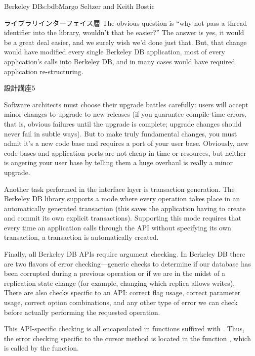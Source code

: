 \begin{aosachapter}{Berkeley DB}{s:bdb}{Margo Seltzer and Keith Bostic}
\begin{aosasect1}{ライブラリインターフェイス層}
The obvious question is ``why not pass a thread identifier into the
library, wouldn't that be easier?'' The answer is yes, it would be a
great deal easier, and we surely wish we'd done just that. But, that
change would have modified every single Berkeley DB application, most
of every application's calls into Berkeley DB, and in many cases would
have required application re-structuring. 

\begin{aosabox}{設計講座5}

Software architects must choose their upgrade battles carefully: users
will accept minor changes to upgrade to new releases (if you guarantee
compile-time errors, that is, obvious failures until the upgrade is
complete; upgrade changes should never fail in subtle ways). But to
make truly fundamental changes, you must admit it's a new code base
and requires a port of your user base. Obviously, new code bases and
application ports are not cheap in time or resources, but neither is
angering your user base by telling them a huge overhaul is really a
minor upgrade.

\end{aosabox}

Another task performed in the interface layer is transaction
generation.  The Berkeley DB library supports a mode where every
operation takes place in an automatically generated transaction (this
saves the application having to create and commit its own explicit
transactions). Supporting this mode requires that every time an
application calls through the API without specifying its own
transaction, a transaction is automatically created.

Finally, all Berkeley DB APIs require argument checking. In Berkeley
DB there are two flavors of error checking---generic checks to
determine if our database has been corrupted during a previous
operation or if we are in the midst of a replication state change (for
example, changing which replica allows writes). There are also checks
specific to an API: correct flag usage, correct parameter usage,
correct option combinations, and any other type of error we can check
before actually performing the requested operation.

This API-specific checking is all encapsulated in functions suffixed
with . Thus, the error checking specific to the cursor
 method is located in the function ,
which is called by the  function.


\end{aosasect1}
\end{aosachapter}
